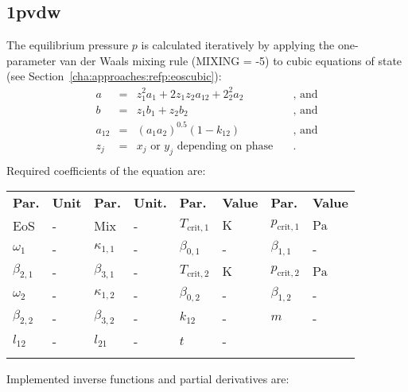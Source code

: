\subsection{1pvdw}
\label{cha:approaches:abs:mic:1pvdw}
%
The equilibrium pressure $p$ is calculated iteratively by applying the one-parameter van der Waals mixing rule (MIXING = -5) to cubic equations of state (see Section~\ref{cha:approaches:refp:eoscubic}):
%
\begin{equation*}
	\begin{split}
		a &=& z_1^2 a_1 + 2 z_1 z_2 a_{12} + 2_2^2 a_2 & \quad\text{, and} \\
		b &=& z_1 b_1 + z_2 b_2 & \quad\text{, and} \\
		a_{12} &=& \left( a_1 a_2 \right) ^{0.5} \left(1 - k_{12} \right) & \quad\text{, and} \\
		z_j &=& x_j \textrm { or } y_j \textrm{ depending on phase} & \quad\text{.} \\
	\end{split}
\end{equation*}
%
Required coefficients of the equation are:
%
\begin{longtable}[l]{ll|ll|ll|ll}
\toprule
\addlinespace
\textbf{Par.} & \textbf{Unit} & \textbf{Par.} &	\textbf{Unit.} & \textbf{Par.} & \textbf{Value} & \textbf{Par.} & \textbf{Value} \\
\addlinespace
\midrule
\endhead

\bottomrule
\endfoot
\bottomrule
\endlastfoot
\addlinespace

EoS & - & Mix & - &$T_\mathrm{crit,1}$ & $\si{\kelvin}$ &$p_\mathrm{crit,1}$ & $\si{\pascal}$ \\
$\omega_{1}$ & - &$\kappa_{1,1}$ & - &$\beta_{0,1}$ & - &$\beta_{1,1}$ & - \\
$\beta_{2,1}$ & - &$\beta_{3,1}$ & - &$T_\mathrm{crit,2}$ & $\si{\kelvin}$ &$p_\mathrm{crit,2}$ & $\si{\pascal}$ \\
$\omega_{2}$ & - &$\kappa_{1,2}$ & - &$\beta_{0,2}$ & - &$\beta_{1,2}$ & - \\
$\beta_{2,2}$ & - &$\beta_{3,2}$ & - &$k_{12}$ & - &$m$ & - \\
$l_{12}$ & - & $l_{21}$ & - & $t$ & - & &  \\

\addlinespace
\end{longtable}
%
Implemented inverse functions and partial derivatives are:
%
